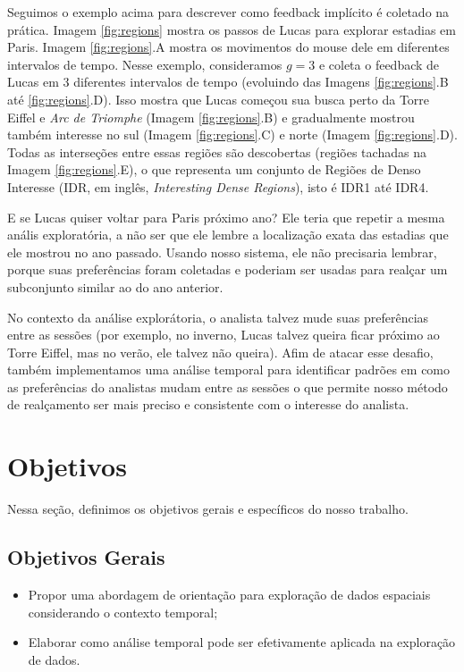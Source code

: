 Seguimos o exemplo acima para descrever como feedback implícito é coletado na prática. Imagem \ref{fig:regions} mostra os passos de Lucas para explorar estadias em Paris. Imagem \ref{fig:regions}.A mostra os movimentos do mouse dele em diferentes intervalos de tempo. Nesse exemplo, consideramos $g = 3$ e coleta o feedback de Lucas em 3 diferentes intervalos de tempo (evoluindo das Imagens \ref{fig:regions}.B até \ref{fig:regions}.D). Isso mostra que Lucas começou sua busca perto da Torre Eiffel e {\em Arc de Triomphe} (Imagem \ref{fig:regions}.B) e gradualmente mostrou também interesse no sul (Imagem \ref{fig:regions}.C) e norte (Imagem \ref{fig:regions}.D). Todas as interseções entre essas regiões são descobertas (regiões tachadas na Imagem \ref{fig:regions}.E), o que representa um conjunto de Regiões de Denso Interesse (IDR, em inglês, {\em Interesting Dense Regions}), isto é IDR1 até IDR4.

E se Lucas quiser voltar para Paris próximo ano? Ele teria que repetir a mesma anális exploratória, a não ser que ele lembre a localização exata das estadias que ele mostrou no ano passado. Usando nosso sistema, ele não precisaria lembrar, porque suas preferências foram coletadas e poderiam ser usadas para realçar um subconjunto similar ao do ano anterior.

No contexto da análise explorátoria, o analista talvez mude suas preferências entre as sessões (por exemplo, no inverno, Lucas talvez queira ficar próximo ao Torre Eiffel, mas no verão, ele talvez não queira). Afim de atacar esse desafio, também implementamos uma análise temporal para identificar padrões em como as preferências do analistas mudam entre as sessões o que permite nosso método de realçamento ser mais preciso e consistente com o interesse do analista.

\section{Objetivos}

Nessa seção, definimos os objetivos gerais e específicos do nosso trabalho.

\subsection{Objetivos Gerais}

\begin{itemize}
	\item Propor uma abordagem de orientação para exploração de dados espaciais considerando o contexto temporal;
	\item Elaborar como análise temporal pode ser efetivamente aplicada na exploração de dados.
\end{itemize}

